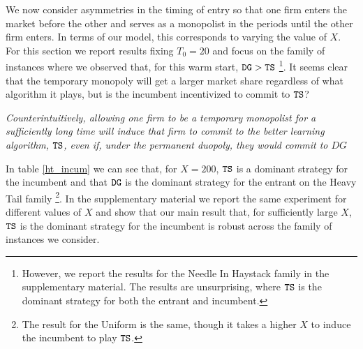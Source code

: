 \documentclass[../competing_bandits.tex]{subfiles}
\begin{document}
 We now consider asymmetries in the timing of entry so that one firm enters the market before the other and serves as a monopolist in the periods until the other firm enters. In terms of our model, this corresponds to varying the value of $X$. For this section we report results fixing $T_0 = 20$ and focus on the family of instances where we observed that, for this warm start, $\mathtt{DG} > \mathtt{TS}$ \footnote{However, we report the results for the Needle In Haystack family in the supplementary material. The results are unsurprising, where $\mathtt{TS}$ is the dominant strategy for both the entrant and incumbent.}. It seems clear that the temporary monopoly will get a larger market share regardless of what algorithm it plays, but is the incumbent incentivized to commit to $\mathtt{TS}$?

\begin{finding}
\textit{Counterintuitively, allowing one firm to be a temporary monopolist for a sufficiently long time will induce that firm to commit to the better learning algorithm, $\mathtt{TS}$, even if, under the permanent duopoly, they would commit to $DG$}
\end{finding}

In table \ref{ht_incum} we can see that, for $X = 200$, $\mathtt{TS}$ is a dominant strategy for the incumbent and that $\mathtt{DG}$ is the dominant strategy for the entrant on the Heavy Tail family \footnote{The result for the Uniform is the same, though it takes a higher $X$ to induce the incumbent to play $\mathtt{TS}$.}. In the supplementary material we report the same experiment for different values of $X$ and show that our main result that, for sufficiently large $X$, $\mathtt{TS}$ is the dominant strategy for the incumbent is robust across the family of instances we consider.
\end{document}
